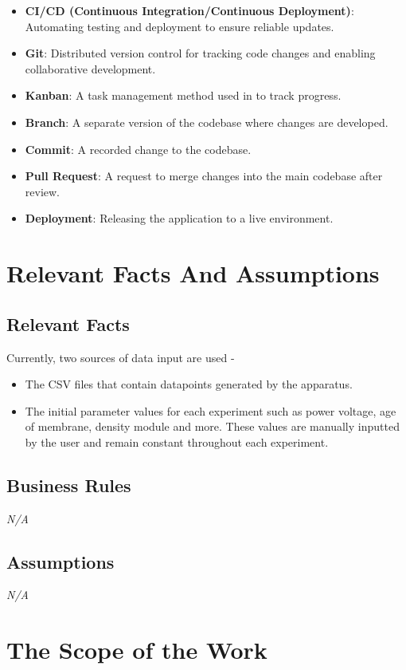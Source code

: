 \documentclass[12pt]{article}
\begin{document}
\begin{itemize}
    \item \textbf{CI/CD (Continuous Integration/Continuous Deployment)}:
    Automating testing and deployment to ensure reliable updates.
    \item \textbf{Git}: Distributed version control for tracking code changes
    and enabling collaborative development.
    \item \textbf{Kanban}: A task management method used in to track progress.
    \item \textbf{Branch}: A separate version of the codebase where changes are
    developed.
    \item \textbf{Commit}: A recorded change to the codebase.
    \item \textbf{Pull Request}: A request to merge changes into the main
    codebase after review.
    \item \textbf{Deployment}: Releasing the application to a live environment.
\end{itemize}

\section{Relevant Facts And Assumptions}
\subsection{Relevant Facts}
Currently, two sources of data input are used -
\begin{itemize}
  \item The CSV files that contain datapoints generated by the apparatus.
  \item The initial parameter values for each experiment such as power voltage,
  age of membrane, density module and more. These values are manually inputted
  by the user and remain constant throughout each experiment.
\end{itemize}

\subsection{Business Rules}
\emph{N/A}
\subsection{Assumptions}
\emph{N/A}

\section{The Scope of the Work}
\end{document}

